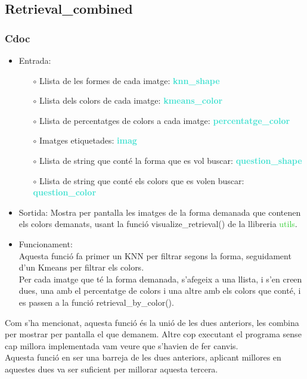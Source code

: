 \documentclass[a4paper, 11pt]{article}
\begin{document}
\newpage


\subsection{Retrieval\_combined}\label{combined}
\subsubsection{Cdoc}
\begin{itemize}
    \item Entrada: 
    \begin{itemize}
        \item[$\circ$] Llista de les formes de cada imatge: \textbf{\textcolor{Turquoise}{knn\_shape}}
        \item[$\circ$] Llista dels colors de cada imatge: \textbf{\textcolor{Turquoise}{kmeans\_color}}
        \item[$\circ$] Llista de percentatges de colors a cada imatge: \textbf{\textcolor{Turquoise}{percentatge\_color}}
        \item[$\circ$] Imatges etiquetades: \textbf{\textcolor{Turquoise}{imag}}
        \item[$\circ$] Llista de string que conté la forma que es vol buscar: \textbf{\textcolor{Turquoise}{question\_shape}}
        \item[$\circ$] Llista de string que conté els colors que es volen buscar: \textbf{\textcolor{Turquoise}{question\_color}}
    \end{itemize}
    \item Sortida: Mostra per pantalla les imatges de la forma demanada que contenen els colors demanats, usant la funció \textcolor{funcblue}{visualize\_retrieval()} de la llibreria \textcolor{LimeGreen}{utils}.
    \item Funcionament: \\
    Aquesta funció fa primer un KNN per filtrar segons la forma, seguidament d'un Kmeans per filtrar els colors.\\
    Per cada imatge que té la forma demanada, s'afegeix a una llista, i s'en creen dues, una amb el percentatge de colors i una altre amb els colors que conté, i es passen a la funció \textcolor{funcblue}{retrieval\_by\_color()}.
\end{itemize}
Com s'ha mencionat, aquesta funció és la unió de les dues anteriors, les combina per mostrar per pantalla el que demanem. Altre cop executant el programa sense cap millora implementada vam veure que s'havien de fer canvis. \\
Aquesta funció en ser una barreja de les dues anteriors, aplicant millores en aquestes dues va ser suficient per millorar aquesta tercera.
\end{document}
